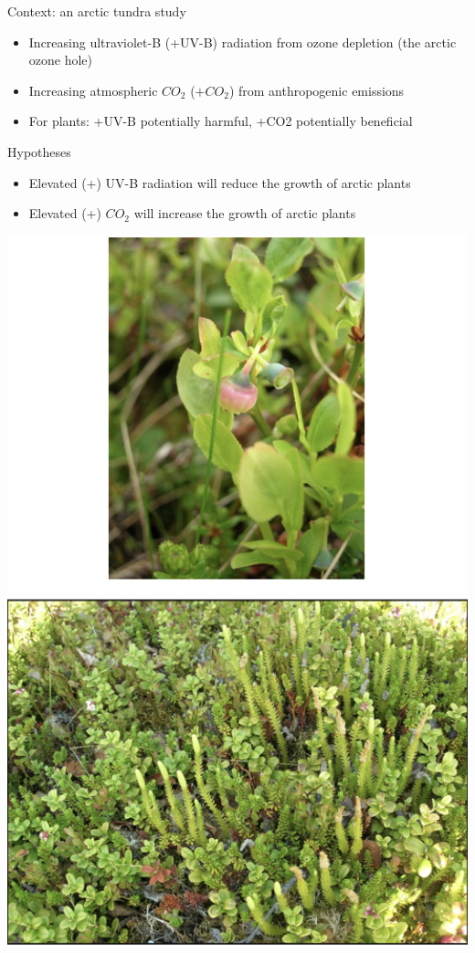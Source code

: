 \documentclass[
]{book}
\providecommand{\tightlist}{%
  \setlength{\itemsep}{0pt}\setlength{\parskip}{0pt}}
\begin{document}
Context: an arctic tundra study

\begin{itemize}
\tightlist
\item
  Increasing ultraviolet-B (+UV-B) radiation from ozone depletion (the arctic ozone hole)
\item
  Increasing atmospheric \(CO_{2}\) (\(+CO_{2}\)) from anthropogenic emissions
\item
  For plants: +UV-B potentially harmful, +CO2 potentially beneficial
\end{itemize}

Hypotheses

\begin{itemize}
\tightlist
\item
  Elevated (+) UV-B radiation will reduce the growth of arctic plants
\item
  Elevated (+) \(CO_{2}\) will increase the growth of arctic plants
\end{itemize}

\includegraphics[width=6.69in]{images/ArcticPlants}
\end{document}
